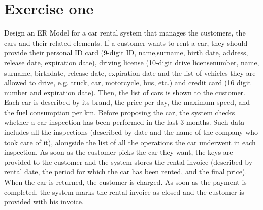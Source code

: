 \section{Exercise one}

Design an ER Model for a car rental system that manages the customers, the cars and their related elements. 
If a customer wants to rent a car, they should provide their personal ID card (9-digit ID, name,surname, birth date, address, release date, expiration date), driving license (10-digit drive licensenumber, name, surname, birthdate, release date, expiration date and the list of vehicles they are allowed to drive, e.g. truck, car, motorcycle, bus, etc.) and credit card (16 digit number and expiration date). 
Then, the list of cars is shown to the customer. Each car is described by its brand, the price per day, the maximum speed, and the fuel consumption per km. 
Before proposing the car, the system checks whether a car inspection has been performed in the last 3 months. 
Such data includes all the inspections (described by date and the name of the company who took care of it), alongside the list of all the operations the car underwent in each inspection. 
As soon as the customer picks the car they want, the keys are provided to the customer and the system stores the rental invoice (described by rental date, the period for which the car has been rented, and the final price). 
When the car is returned, the customer is charged. 
As soon as the payment is completed, the system marks the rental invoice as closed and the customer is provided with his invoice.

